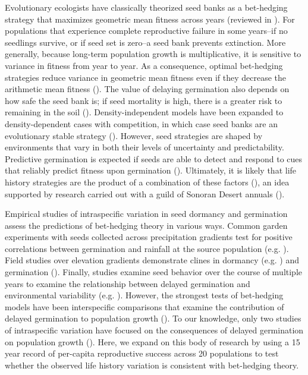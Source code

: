 \documentclass[12pt, oneside, titlepage]{article}   	%
\begin{document}
Evolutionary ecologists have classically theorized seed banks as a bet-hedging strategy that maximizes geometric mean fitness across years (reviewed in \cite{philippi1989,simons2011}). For populations that experience complete reproductive failure in some years--if no seedlings survive, or if seed set is zero--a seed bank prevents extinction. More generally, because long-term population growth is multiplicative, it is sensitive to variance in fitness from year to year. As a consequence, optimal bet-hedging strategies reduce variance in geometric mean fitness even if they decrease the arithmetic mean fitness (\cite{cohen1966}). The value of delaying germination also depends on how safe the seed bank is; if seed mortality is high, there is a greater risk to remaining in the soil (\cite{cohen1966}). Density-independent models have been expanded to density-dependent cases with competition, in which case seed banks are an evolutionary stable strategy (\cite{ellner1985,ellner1985a}). However, seed strategies are shaped by environments that vary in both their levels of uncertainty and predictability. Predictive germination is expected if seeds are able to detect and respond to cues that reliably predict fitness upon germination (\cite{cohen1967}). Ultimately, it is likely that life history strategies are the product of a combination of these factors (\cite{simons2011}), an idea supported by research carried out with a guild of Sonoran Desert annuals (\cite{venable2007,gremer2014,gremer2016}).

Empirical studies of intraspecific variation in seed dormancy and germination assess the predictions of bet-hedging theory in various ways. Common garden experiments with seeds collected across precipitation gradients test for positive correlations between germination and rainfall at the source population (e.g. \cite{hacker1984,hacker1989,philippi1993a,clauss2000}). Field studies over elevation gradients demonstrate clines in dormancy (e.g. \cite{fernandez-pascual2013}) and germination (\cite{gremer2020}). Finally, studies examine seed behavior over the course of multiple years to examine the relationship between delayed germination and environmental variability (e.g. \cite{philippi1993,evans2007}). However, the strongest tests of bet-hedging models have been interspecific comparisons that examine the contribution of delayed germination to population growth (\cite{venable2007,gremer2014,gremer2016}). To our knowledge, only two studies of intraspecific variation have focused on the consequences of delayed germination on population growth (\cite{clauss1999a,evans2007}). Here, we expand on this body of research by using a 15 year record of per-capita reproductive success across 20 populations to test whether the observed life history variation is consistent with bet-hedging theory. 
 
\end{document}
